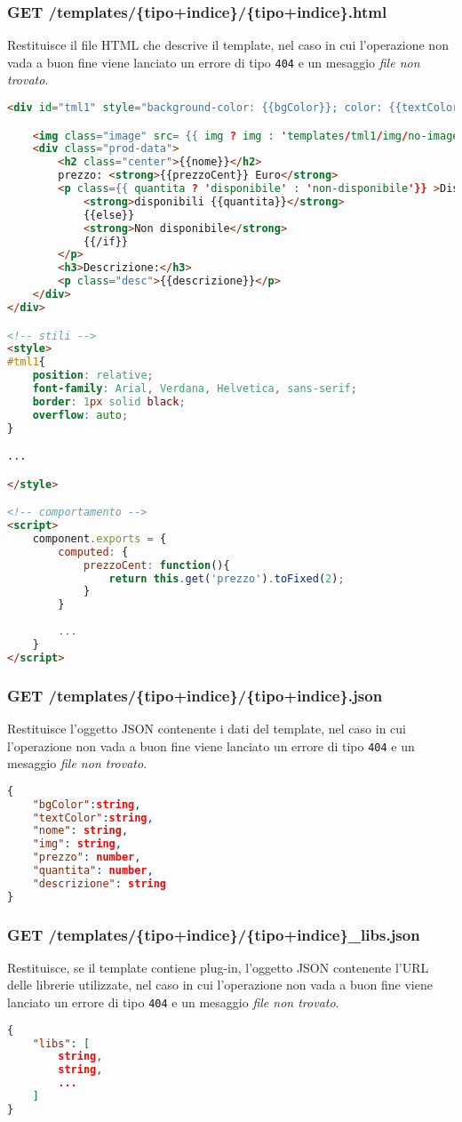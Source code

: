 \subsubsection{GET /templates/\{tipo+indice\}/\{tipo+indice\}.html}
Restituisce il file HTML che descrive il template, nel caso in cui l'operazione non vada a buon fine viene lanciato un errore di tipo \texttt{404} e un mesaggio \textit{file non trovato}.
\begin{lstlisting}[language=HTML, caption=Esempio di richiesta http-get su /templates/\{tipo+indice\}/\{tipo+indice\}.html.]
<div id="tml1" style="background-color: {{bgColor}}; color: {{textColor}};">

	<img class="image" src= {{ img ? img : 'templates/tml1/img/no-image.png'}}>
	<div class="prod-data">
		<h2 class="center">{{nome}}</h2>
		prezzo: <strong>{{prezzoCent}} Euro</strong>
		<p class={{ quantita ? 'disponibile' : 'non-disponibile'}} >Disponibilità: {{#if quantita}}
			<strong>disponibili {{quantita}}</strong>
			{{else}}
			<strong>Non disponibile</strong>
			{{/if}}
		</p>
		<h3>Descrizione:</h3>
		<p class="desc">{{descrizione}}</p>
	</div>
</div>

<!-- stili -->
<style>
#tml1{
	position: relative;
	font-family: Arial, Verdana, Helvetica, sans-serif;
	border: 1px solid black;
	overflow: auto;
}

...

</style>

<!-- comportamento -->
<script>
	component.exports = {
		computed: {
			prezzoCent: function(){
				return this.get('prezzo').toFixed(2);
			}
		}
		
		...
	}
</script>
\end{lstlisting}

\subsubsection{GET /templates/\{tipo+indice\}/\{tipo+indice\}.json}
Restituisce l'oggetto JSON contenente i dati del template, nel caso in cui l'operazione non vada a buon fine viene lanciato un errore di tipo \texttt{404} e un mesaggio \textit{file non trovato}.
\begin{lstlisting}[language=JSON, caption=Esempio di oggetto JSON restituito.]
{
	"bgColor":string,
	"textColor":string,
	"nome": string,
	"img": string,
	"prezzo": number,
	"quantita": number,
	"descrizione": string
}
\end{lstlisting}
\subsubsection{GET /templates/\{tipo+indice\}/\{tipo+indice\}\_libs.json}
Restituisce, se il template contiene plug-in, l'oggetto JSON contenente l'URL delle librerie utilizzate, nel caso in cui l'operazione non vada a buon fine viene lanciato un errore di tipo \texttt{404} e un mesaggio \textit{file non trovato}.
\begin{lstlisting}[language=JSON, caption=Esempio di oggetto JSON restituito.]
{
	"libs": [
		string,
		string,
		...
	]
}
\end{lstlisting}

